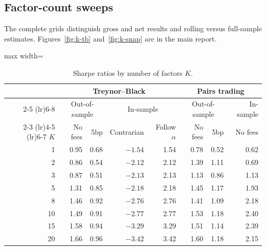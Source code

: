 \documentclass[11pt,letterpaper]{article}
\begin{document}
\subsection{Factor-count sweeps}
The complete grids distinguish gross and net results and rolling versus full-sample
estimates. Figures~\ref{fig:k-tb} and~\ref{fig:k-snap} are in the main report.

\begin{table}[!htbp]
    \centering
    \caption{Sharpe ratios by number of factors $K$.}
    \label{tab:k}
    \begin{adjustbox}{max width=\linewidth}
        \begin{tabular}{rrrrrrrr}
            \toprule
            & \multicolumn{4}{c}{Treynor--Black} & \multicolumn{3}{c}{Pairs trading} \\
            \cmidrule(lr){2-5} \cmidrule(lr){6-8}
            & \multicolumn{2}{c}{Out-of-sample} & \multicolumn{2}{c}{In-sample} & \multicolumn{2}{c}{Out-of-sample} & In-sample \\
            \cmidrule(lr){2-3} \cmidrule(lr){4-5} \cmidrule(lr){6-7}
            $K$ & No fees & 5bp & Contrarian & Follow $\alpha$ & No fees & 5bp & No fees \\
            \midrule
            1 & 0.95 & 0.68 & $-1.54$ & 1.54 & 0.78 & 0.52 & 0.62 \\
            2 & 0.86 & 0.54 & $-2.12$ & 2.12 & 1.39 & 1.11 & 0.69 \\
            3 & 0.87 & 0.51 & $-2.13$ & 2.13 & 1.13 & 0.86 & 1.13 \\
            5 & 1.31 & 0.85 & $-2.18$ & 2.18 & 1.45 & 1.17 & 1.93 \\
            8 & 1.46 & 0.92 & $-2.76$ & 2.76 & 1.41 & 1.09 & 2.18 \\
            10 & 1.49 & 0.91 & $-2.77$ & 2.77 & 1.53 & 1.18 & 2.40 \\
            15 & 1.58 & 0.94 & $-3.29$ & 3.29 & 1.51 & 1.14 & 2.39 \\
            20 & 1.66 & 0.96 & $-3.42$ & 3.42 & 1.60 & 1.18 & 2.15 \\
            \bottomrule
        \end{tabular}
    \end{adjustbox}
\end{table}
\end{document}

